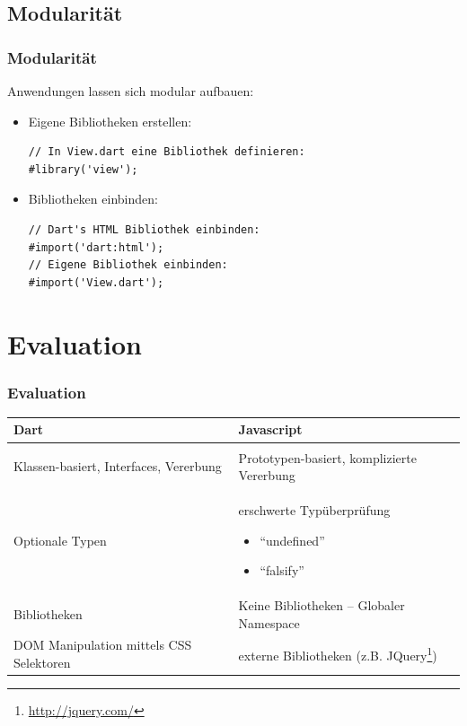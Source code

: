 \documentclass{beamer}
\begin{document}
\subsection{Modularität}
\begin{frame}[fragile]
\frametitle{Modularität}

Anwendungen lassen sich modular aufbauen:
\begin{itemize}
\item Eigene Bibliotheken erstellen:
\begin{lstlisting}
// In View.dart eine Bibliothek definieren:
#library('view');
\end{lstlisting}
\pause
\item Bibliotheken einbinden:
\begin{lstlisting}
// Dart's HTML Bibliothek einbinden:
#import('dart:html');
// Eigene Bibliothek einbinden:
#import('View.dart');
\end{lstlisting}
\end{itemize}

\end{frame}

\section{Evaluation}
\begin{frame}
\frametitle{Evaluation}
\begin{center}
\begin{tabular}{ p{} || p{}}
Dart & Javascript\\ [0.4em]
\hline \\ [0.2em]
Klassen-basiert, Interfaces, Vererbung & Prototypen-basiert, komplizierte Vererbung\\ [0.4em]
Optionale Typen & erschwerte Typüberprüfung \newline \begin{itemize} \item ``undefined'' \item ``falsify''\end{itemize}\\ [0.4em]
Bibliotheken & Keine Bibliotheken \newline -- Globaler Namespace\\ [0.4em]
DOM Manipulation mittels CSS Selektoren & externe Bibliotheken (z.B. JQuery\footnote{\url{http://jquery.com/}})\\ [0.4em]
\end{tabular}
\end{center}
\end{frame}
\end{document}
